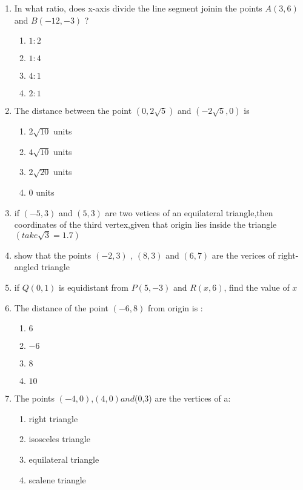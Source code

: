 \begin{enumerate}
\item In what ratio, does x-axis divide the line segment joinin the points $A(3,6)$ and $B(-12, -3)$ ?
\begin{enumerate}
\item $1:2$
\item $1:4$
\item $4:1$ 
\item $2:1$
\end{enumerate}
\item The distance between the point $(0,2\sqrt{5})$ and $(-2\sqrt{5},0)$ is 
\begin{enumerate}
\item $2\sqrt{10}$ units
\item $4\sqrt{10}$ units
\item $2\sqrt{20}$ units
\item $0$ units
\end{enumerate}
\item if $(-5,3)$ and $(5,3)$ are two vetices of an equilateral triangle,then coordinates of the third vertex,given that origin lies inside the triangle $(take \sqrt{3}=1.7)$
\item show that the points $(-2,3)$ , $(8,3)$ and $(6,7)$ are the verices of right-angled triangle
\item if $Q(0,1)$ is equidistant from $P(5,-3)$ and $R(x,6)$, find the value of $x$
\item The distance of the point $(-6,8)$ from origin is :
\begin{enumerate}
\item $6$
\item $-6$
\item $8$
\item $10$
\end{enumerate}
\item The points $(-4,0)$,$(4,0) and $(0,3) are the vertices of a:
\begin{enumerate}
\item right triangle
\item isosceles triangle
\item equilateral triangle
\item scalene triangle
\end{enumerate}
\end{enumerate}
